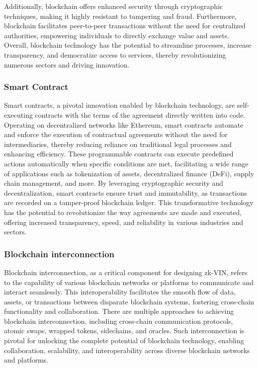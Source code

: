 \documentclass[conference]{IEEEtran}
\begin{document}
Additionally, blockchain offers enhanced security through cryptographic techniques, making it highly resistant to tampering and fraud. Furthermore, blockchain facilitates peer-to-peer transactions without the need for centralized authorities, empowering individuals to directly exchange value and assets. Overall, blockchain technology has the potential to streamline processes, increase transparency, and democratize access to services, thereby revolutionizing numerous sectors and driving innovation.

\subsubsection{Smart Contract}
Smart contracts, a pivotal innovation enabled by blockchain technology, are self-executing contracts with the terms of the agreement directly written into code. Operating on decentralized networks like Ethereum, smart contracts automate and enforce the execution of contractual agreements without the need for intermediaries, thereby reducing reliance on traditional legal processes and enhancing efficiency. These programmable contracts can execute predefined actions automatically when specific conditions are met, facilitating a wide range of applications such as tokenization of assets, decentralized finance (DeFi), supply chain management, and more. By leveraging cryptographic security and decentralization, smart contracts ensure trust and immutability, as transactions are recorded on a tamper-proof blockchain ledger. This transformative technology has the potential to revolutionize the way agreements are made and executed, offering increased transparency, speed, and reliability in various industries and sectors.
\subsubsection{Blockchain interconnection}
Blockchain interconnection, as a critical component for designing zk-VIN, refers to the capability of various blockchain networks or platforms to communicate and interact seamlessly. This interoperability facilitates the smooth flow of data, assets, or transactions between disparate blockchain systems, fostering cross-chain functionality and collaboration. There are multiple approaches to achieving blockchain interconnection, including cross-chain communication protocols, atomic swaps, wrapped tokens, sidechains, and oracles. Such interconnection is pivotal for unlocking the complete potential of blockchain technology, enabling collaboration, scalability, and interoperability across diverse blockchain networks and platforms.
\end{document}
